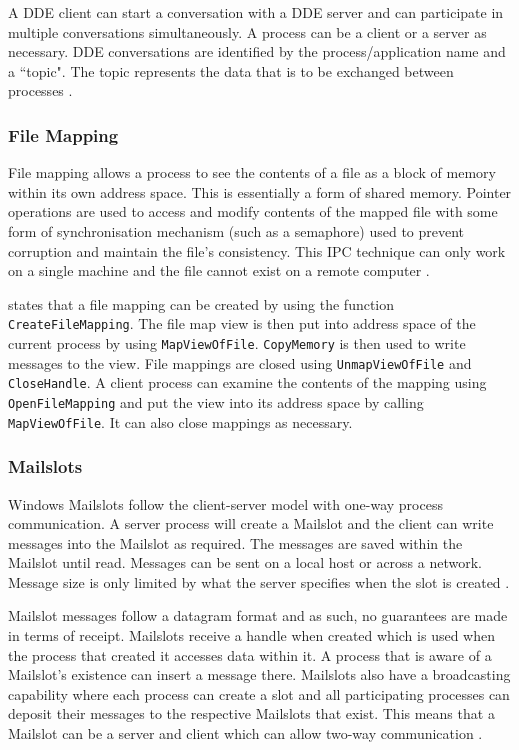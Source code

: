 \documentclass[12pt] {newrucsthesis}    %
\def\code#1{\texttt{#1}}
\begin{document}
          A DDE client can start a conversation with a DDE server and can participate in multiple conversations
          simultaneously. A process can be a client or a server as necessary. DDE conversations are identified by
          the process/application name and a ``topic". The topic represents the data that is to be exchanged between
          processes \citep{MSDN_API}.

        \subsubsection{File Mapping}
          File mapping allows a process to see the contents of a file as a block of memory within its own address space.
          This is essentially a form of shared memory. Pointer operations are used to access and modify contents of the
          mapped file with some form of synchronisation mechanism (such as a semaphore) used to prevent corruption and
          maintain the file's consistency. This IPC technique can only work on a single machine and the file cannot exist
          on a remote computer \citep{MSDN_API}.

          \cite{IPCWindowsLinkedInSlides} states that a file mapping can be created by using the function \code{CreateFileMapping}.
          The file map view is then put into address space of the current process by using \code{MapViewOfFile}. \code{CopyMemory} is
          then used to write messages to the view. File mappings are closed using \code{UnmapViewOfFile} and \code{CloseHandle}.
          A client process can examine the contents of the mapping using \code{OpenFileMapping} and put the view into its address
          space by calling \code{MapViewOfFile}. It can also close mappings as necessary.

        \subsubsection{Mailslots}
          Windows Mailslots follow the client-server model with one-way process communication. A server process will create a Mailslot
          and the client can write messages into the Mailslot as required. The messages are saved within the Mailslot until read.
          Messages can be sent on a local host or across a network. Message size is only limited by what the server specifies when
          the slot is created \citep{MSDN_API}.

          Mailslot messages follow a datagram format and as such, no guarantees are made in terms of receipt. Mailslots receive a
          handle when created which is used when the process that created it accesses data within it. A process that is aware of a
          Mailslot's existence can insert a message there. Mailslots also have a broadcasting capability where each process can
          create a slot and all participating processes can deposit their messages to the respective Mailslots that exist. This
          means that a Mailslot can be a server and client which can allow two-way communication \citep{MSDN_API}.
\end{document}
